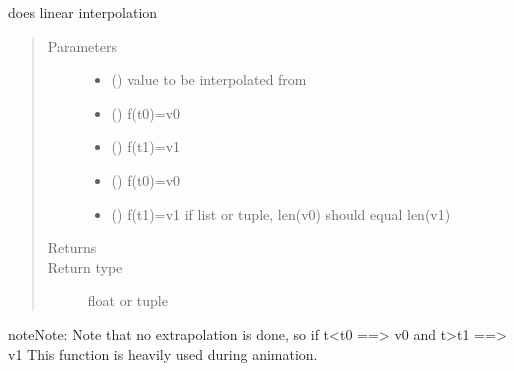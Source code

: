 \documentclass[letterpaper,10pt,english]{sphinxmanual}
\begin{document}
\begin{fulllineitems}
\label{\detokenize{Reference:salabim.interpolate}}
does linear interpolation
\begin{quote}\begin{description}
\item[{Parameters}] \leavevmode\begin{itemize}
\item {} 
 () \textendash{} value to be interpolated from

\item {} 
 () \textendash{} f(t0)=v0

\item {} 
 () \textendash{} f(t1)=v1

\item {} 
 (\sphinxstyleliteralemphasis{\sphinxupquote{, }}) \textendash{} f(t0)=v0

\item {} 
 (\sphinxstyleliteralemphasis{\sphinxupquote{, }}) \textendash{} f(t1)=v1 
if list or tuple, len(v0) should equal len(v1)

\end{itemize}

\item[{Returns}] \leavevmode
{}

\item[{Return type}] \leavevmode
float or tuple

\end{description}\end{quote}

\begin{sphinxadmonition}{note}{Note:}
Note that no extrapolation is done, so if t\textless{}t0 ==\textgreater{} v0  and t\textgreater{}t1 ==\textgreater{} v1 
This function is heavily used during animation.
\end{sphinxadmonition}

\end{fulllineitems}
\end{document}
